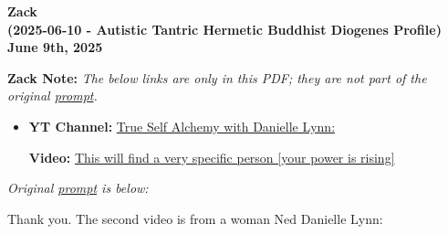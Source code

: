 \documentclass{article}
\begin{document}
\begin{center}
\textbf{Zack}\\
\textbf{(2025-06-10 - Autistic Tantric Hermetic Buddhist Diogenes Profile)}\\
\textbf{June 9th, 2025}
\end{center}

\textbf{Zack Note:}
\emph{The below links are only in this PDF; they are not part of the original \hyperlink{gloss:prompt}{prompt}.}

\begin{itemize}
  \item \textbf{YT Channel:} \href{https://www.youtube.com/@alchemydragon}{True Self Alchemy with Danielle Lynn:} 
  \begin{itemize}
      \textbf{Video:} \href{https://www.youtube.com/watch?v=rCFJwV9esGM}{This will find a very specific person [your power is rising]}
  \end{itemize}
\end{itemize}

\emph{Original \hyperlink{gloss:prompt}{prompt} is below:}

Thank you. The second video is from a woman Ned Danielle Lynn:
\end{document}
